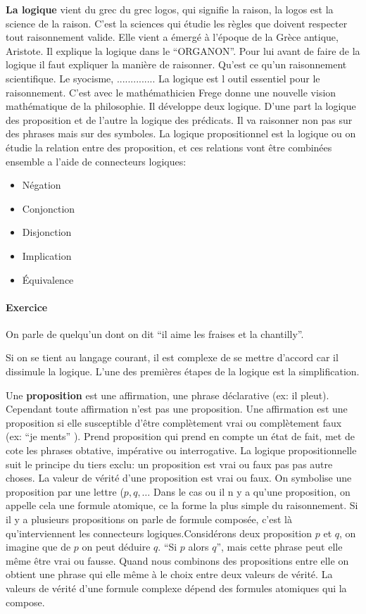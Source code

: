 \textbf{La logique} vient du grec du grec logos, qui signifie la raison, la logos est la science de la raison.
C'est la sciences qui étudie les règles que doivent respecter tout raisonnement valide.
Elle vient a émergé à l'époque de la Grèce antique, Aristote.
Il explique la logique dans le ``ORGANON''.
Pour lui avant de faire de la logique il faut expliquer la manière de raisonner.
Qu'est ce qu'un raisonnement scientifique.
Le syocisme, ..............
La logique est l outil essentiel pour le raisonnement.
C'est avec le mathémathicien Frege donne une nouvelle vision mathématique de la philosophie.
Il développe deux logique.
D'une part la logique des proposition et de l'autre la logique des prédicats.
Il va raisonner non pas sur des phrases mais sur des symboles.
La logique propositionnel est la logique ou on étudie  la relation entre des proposition, et ces relations vont être combinées ensemble a l'aide de connecteurs logiques:
\begin{itemize}
	\item Négation
	\item Conjonction
	\item Disjonction
	\item Implication
	\item Équivalence
\end{itemize}
\paragraph{Exercice}
On parle de quelqu'un dont on dit ``il aime les fraises et la chantilly''.

Si on se tient au langage courant, il est complexe de se mettre d'accord car il dissimule la logique. L'une des premières étapes de la logique est la simplification.

Une \textbf{proposition} est une affirmation, une phrase déclarative (ex: il pleut).
Cependant toute affirmation n'est pas une proposition.
Une affirmation est une proposition si elle susceptible d'être complètement vrai ou complètement faux (ex: ``je ments'' ).
Prend proposition qui prend en compte un état de fait, met de cote les phrases obtative, impérative ou interrogative.
La logique propositionnelle suit le principe du tiers exclu: un proposition est vrai ou faux pas pas autre choses.
La valeur de vérité d'une proposition est vrai ou faux.
On symbolise une proposition par une lettre ($p,q,\dots$
Dans le cas ou il n y a qu'une proposition, on appelle cela une formule atomique, ce la forme la plus simple du raisonnement.
Si il y a plusieurs propositions on parle de formule composée, c'est là qu'interviennent les connecteurs logiques.Considérons deux proposition $p$ et $q$, on imagine que de $p$ on peut déduire $q$.
``Si $p$ alors $q$'', mais cette phrase peut elle même être vrai ou fausse.
Quand nous combinons des propositions entre elle on obtient une phrase qui elle même à le choix entre deux valeurs de vérité.
La valeurs de vérité d'une formule complexe dépend des formules atomiques qui la compose.

